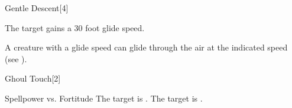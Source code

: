 \begin{spellsection}[Mass]{Gentle Descent}[4]
    \begin{spellheader}
    \end{spellheader}
    \begin{spellcontent}
        \begin{spelltargetinginfo}
        \end{spelltargetinginfo}
        \begin{spelleffects}
            \spelleffect The target gains a 30 foot glide speed.
            \spelldur \durshort
        \end{spelleffects}
    \end{spellcontent}
    \begin{spellfooter}
        \spellnotes A creature with a glide speed can glide through the air at the indicated speed (see ).
        \miscastexplode
    \end{spellfooter}
\end{spellsection}

\begin{spellsection}{Ghoul Touch}[2]
    \begin{spellheader}
    \end{spellheader}
    \begin{spellcontent}
        \begin{spelltargetinginfo}
        \end{spelltargetinginfo}
        \begin{spelleffects}
            \begin{spellattack}{Spellpower vs. Fortitude}
                \spellsuccess The target is \staggered.
                \spellfailure The target is \sickened.
            \end{spellattack}
            \spelldur \durshort
        \end{spelleffects}
    \end{spellcontent}
    \begin{spellfooter}
        \miscastrandom
    \end{spellfooter}
\end{spellsection}

